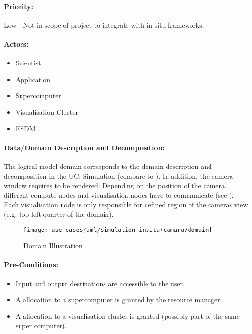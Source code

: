 \paragraph{Priority:}
Low - Not in scope of project to integrate with in-situ frameworks.

\paragraph{Actors:}
\begin{itemize}
	\item Scientist
	\item Application
	\item Supercomputer
	\item Visualisation	Cluster
	\item ESDM
\end{itemize}


\paragraph{Data/Domain Description and Decomposition:}
The logical model domain corresponds to the domain description and decomposition in the UC: Simulation (compare to ).
In addition, the camera window requires to be rendered:
Depending on the position of the camera, different compute nodes and visualisation nodes have to communicate (see ).
Each visualisation node is only responsible for defined region of the cameras view (e.g. top left quarter of the domain).


\begin{figure}
	\centering
	\texttt{[image: use-cases/uml/simulation+insitu+camara/domain]}
	\caption{Domain Illustration}
	\label{fig:domain simulation + in-situ + cam}
\end{figure}



\paragraph{Pre-Conditions:}
\begin{itemize}
	\item Input and output destinations are accessible to the user.
	\item A allocation to a supercomputer is granted by the resource manager.
	\item A allocation to a visualisation cluster is granted (possibly part of the same super computer).
\end{itemize}


